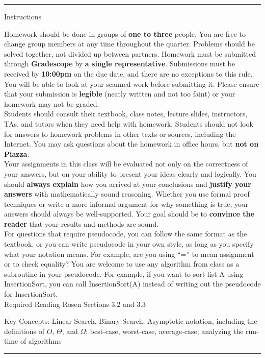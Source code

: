 \documentclass[11pt,letterpaper,unboxed,cm]{hmcpset}
\begin{document}
\begin{center}
\begin{minipage}[t]{5.7in}
\rule{\linewidth}{2pt}
{\sc Instructions}\newline

Homework should be done in groups of {\bf one to three} people. You are free to change group members at any time throughout the quarter.
Problems should be solved together, not divided up between partners.  Homework must be submitted
through {\bf Gradescope} by {\bf a single representative}. Submissions must be received by {\bf 10:00pm} on the due date, and there are no exceptions to this rule.\\

You will be able to look at your scanned work before submitting it.
Please ensure that your submission is {\bf legible} (neatly written and not too faint)
or your homework may not be graded.\\

Students should consult their textbook, class notes, lecture slides, instructors, TAs, and tutors when
they need help with homework. Students should not look for answers to homework problems in other texts or sources, including the Internet. You may ask questions about the homework in office hours, but {\bf not on Piazza}.\\

Your assignments in this class will be evaluated not only on the correctness of your answers, but on your ability to present your ideas clearly and logically. You should {\bf always explain} how you arrived at your conclusions and {\bf justify your answers} with mathematically sound reasoning. Whether you use formal proof techniques or write a more informal argument for why something is true, your answers should always be well-supported. Your goal should be to {\bf convince the reader} that your results and methods are sound. \\

For questions that require pseudocode, you can follow the same format as the textbook, or you can write pseudocode in your own style, as long as you specify what your notation means. For example, are you using ``='' to mean assignment or to check equality? You are welcome to use any algorithm from class as a subroutine in your pseudocode. For example, if you want to sort list A using InsertionSort, you can call InsertionSort(A) instead of writing out the pseudocode for InsertionSort.\\

{\sc Required Reading} Rosen Sections 3.2 and 3.3
\newline

{\sc Key Concepts:} Linear Search, Binary Search; Asymptotic notation, including the definitions of $O$, $\Theta$, and $\Omega$; best-case, worst-case, average-case; analyzing the run-time of algorithms
\newline

\rule{\linewidth}{2pt}
\end{minipage} \hfill


\end{center} \newpage
\end{document}
